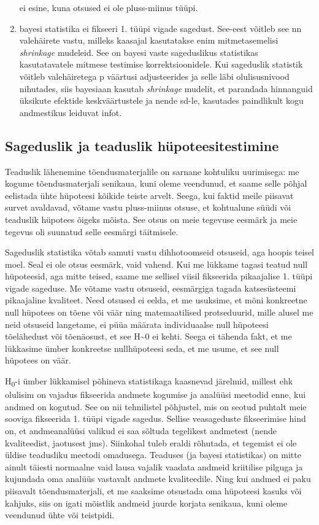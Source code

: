 \documentclass[]{book}
\begin{document}
\begin{enumerate}
  ei esine, kuna otsused ei ole pluss-miinus tüüpi.
\item
  bayesi statistika ei fikseeri 1. tüüpi vigade sagedust. See-eest
  võitleb see nn valehäirete vastu, milleks kaasajal kasutatakse enim
  mitmetasemelisi \emph{shrinkage} mudeleid. See on bayesi vaste
  sageduslikus statistikas kasutatavatele mitmese testimise
  korrektsioonidele. Kui sageduslik statistik võitleb valehäiretega p
  väärtusi adjusteerides ja selle läbi olulisusnivood nihutades, siis
  bayesiaan kasutab \emph{shrinkage} mudelit, et parandada hinnanguid
  üksikute efektide keskväärtustele ja nende sd-le, kasutades
  paindlikult kogu andmestikus leiduvat infot.
\end{enumerate}

\subsection*{Sageduslik ja teaduslik
hüpoteesitestimine}\label{sageduslik-ja-teaduslik-hupoteesitestimine-1}

Teaduslik lähenemine tõendusmaterjalile on sarnane kohtuliku uurimisega:
me kogume tõendusmaterjali senikaua, kuni oleme veendunud, et saame
selle põhjal eelistada ühte hüpoteesi kõikide teiste arvelt. Seega, kui
faktid meile piisavat survet avaldavad, võtame vastu pluss-miinus
otsuse, et kohtualune süüdi või teaduslik hüpotees õigeks mõista. See
otsus on meie tegevuse eesmärk ja meie tegevus oli suunatud selle
eesmärgi täitmisele.

Sageduslik statistika võtab samuti vastu dihhotoomseid otsuseid, aga
hoopis teisel moel. Seal ei ole otsus eesmärk, vaid vahend. Kui me
lükkame tagasi teatud null hüpoteesid, aga mitte teised, saame me
sellisel viisil fikseerida pikaajalise 1. tüüpi vigade sageduse. Me
võtame vastu otsuseid, eesmärgiga tagada katsesüsteemi pikaajaline
kvaliteet. Need otsused ei eelda, et me usuksime, et mõni konkreetne
null hüpotees on tõene või väär ning matemaatilised protseduurid, mille
alusel me neid otsuseid langetame, ei püüa määrata individuaalse null
hüpoteesi tõelähedust või tõenäosust, et see H\textasciitilde{}0 ei
kehti. Seega ei tähenda fakt, et me lükkasime ümber konkreetse
nullhüpoteesi seda, et me usume, et see null hüpotees on väär.

H\textsubscript{0}-i ümber lükkamisel põhineva statistikaga kaasnevad
järelmid, millest ehk olulisim on vajadus fikseerida andmete kogumise ja
analüüsi meetodid enne, kui andmed on kogutud. See on nii tehnilistel
põhjustel, mis on seotud puhtalt meie sooviga fikseerida 1. tüüpi vigade
sagedus. Sellise veasageduste fikseerimise hind on, et andmeanalüüsi
valikud ei saa sõltuda tegelikest andmetest (nende kvaliteedist,
jaotusest jms). Siinkohal tuleb eraldi rõhutada, et tegemist ei ole
üldise teadusliku meetodi omadusega. Teaduses (ja bayesi statistikas) on
mitte ainult täiesti normaalne vaid lausa vajalik vaadata andmeid
kriitilise pilguga ja kujundada oma analüüs vastavalt andmete
kvaliteedile. Ning kui andmed ei paku piisavalt tõendusmaterjali, et me
saaksime otsustada oma hüpoteesi kasuks või kahjuks, siis on igati
mõistlik andmeid juurde korjata senikaua, kuni oleme veendunud ühte või
teistpidi.
\end{document}
